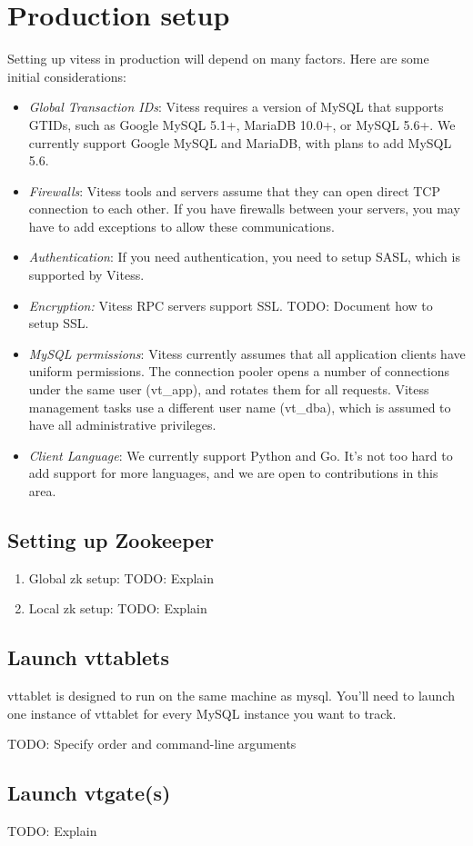 \section{Production setup}\label{Production-Setup}

Setting up vitess in production will depend on many factors.
Here are some initial considerations:
\begin{itemize}
\item \emph{Global Transaction IDs}: Vitess requires a version of MySQL that supports GTIDs, such as Google MySQL 5.1+, MariaDB 10.0+, or MySQL 5.6+. We currently support Google MySQL and MariaDB, with plans to add MySQL 5.6.
\item \emph{Firewalls}: Vitess tools and servers assume that they can open direct TCP connection to each other. If you have firewalls between your servers, you may have to add exceptions to allow these communications.
\item \emph{Authentication}: If you need authentication, you need to setup SASL, which is supported by Vitess.
\item \emph{Encryption:} Vitess RPC servers support SSL. TODO: Document how to setup SSL.
\item \emph{MySQL permissions}: Vitess currently assumes that all
application clients have uniform permissions.
The connection pooler opens a number of connections under
the same user (vt\_app), and rotates them for all requests.
Vitess management tasks use a different user name (vt\_dba),
which is assumed to have all administrative privileges.
\item \emph{Client Language}: We currently support
      Python and Go.
It's not too hard to add support for more languages,
and we are open to contributions in this area.
\end{itemize}

\subsection{Setting up Zookeeper}\hypertarget{setting-up-zookeeper}{}\label{setting-up-zookeeper}
\begin{enumerate}
\item Global zk setup:
TODO: Explain
\item Local zk setup:
TODO: Explain
\end{enumerate}
\subsection{Launch vttablets}\hypertarget{launch-vttablets}{}\label{launch-vttablets}

vttablet is designed to run on the same machine as mysql.
You'll need to launch one instance of vttablet for every MySQL instance you want to track.

TODO: Specify order and command-line arguments

\subsection{Launch vtgate(s)}\hypertarget{launch-vtgates}{}\label{launch-vtgates}

TODO: Explain

